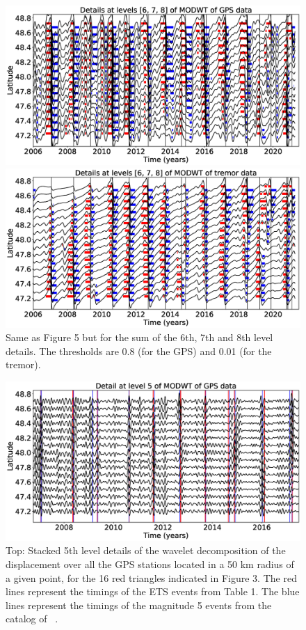 \documentclass{article}
\begin{document}
\begin{figure}
\noindent\includegraphics[width=\textwidth, trim={0cm 0cm 0cm 0cm},clip]{figures/GPS_longer_detail_6-7-8.eps}

\noindent\includegraphics[width=\textwidth, trim={0cm 0cm 0cm 0cm},clip]{figures/tremor_longer_detail_6-7-8.eps}
\caption{Same as Figure 5 but for the sum of the 6th, 7th and 8th level details. The thresholds are 0.8 (for the GPS) and 0.01 (for the tremor).}
\label{pngfiguresample}
\end{figure}

\begin{figure}
\noindent\includegraphics[width=\textwidth, trim={0cm 0cm 0cm 0cm},clip]{figures/GPS_michel_detail_5.eps}
\caption{Top: Stacked 5th level details of the wavelet decomposition of the displacement over all the GPS stations located in a 50 km radius of a given point, for the 16 red triangles indicated in Figure 3. The red lines represent the timings of the ETS events from Table 1. The blue lines represent the timings of the magnitude 5 events from the catalog of ~\citet{MIC_2019}.}
\label{pngfiguresample}
\end{figure}
\end{document}
